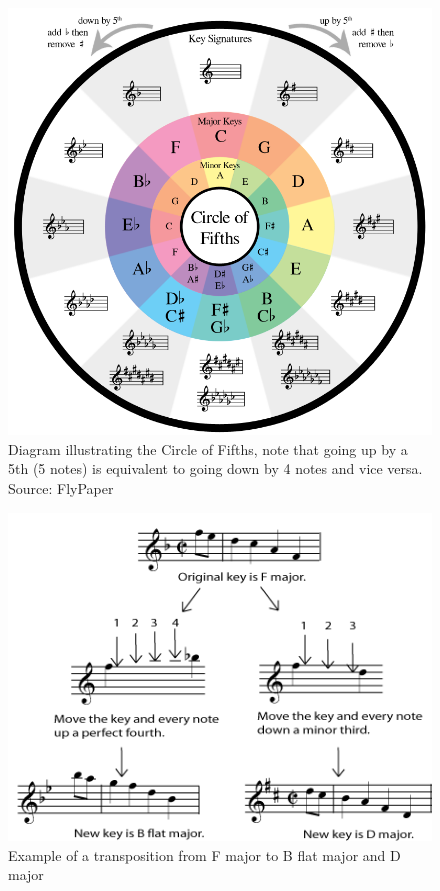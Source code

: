 \documentclass[12pt,]{article}
\begin{document}
\begin{figure}
\centering
\includegraphics[width=\textwidth,height=0.4\textheight]{Images/flypaperfifths.png}
\caption{Diagram illustrating the Circle of Fifths, note that going up
by a 5th (5 notes) is equivalent to going down by 4 notes and vice
versa. Source: FlyPaper}
\end{figure}

\begin{figure}
\centering
\includegraphics[width=\textwidth,height=0.3\textheight]{Images/transp3b.png}
\caption{Example of a transposition from F major to B flat major and D
major}
\end{figure}
\end{document}
